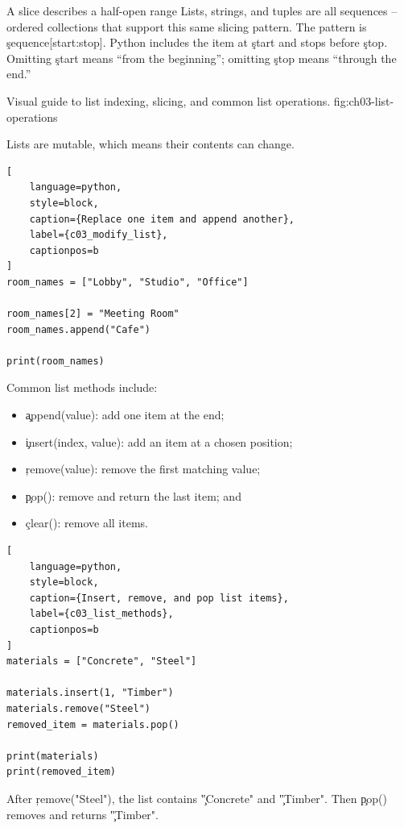 \begin{SyntaxBox}{A slice describes a half-open range}
Lists, strings, and tuples are all sequences -- ordered collections that
support this same slicing pattern. The pattern is \c{sequence[start:stop]}.
Python includes the item at \c{start} and stops before \c{stop}. Omitting
\c{start} means ``from the beginning''; omitting \c{stop} means ``through the
end.''
\end{SyntaxBox}

{Visual guide to list indexing, slicing, and common list operations.}
{fig:ch03-list-operations}


Lists are mutable, which means their contents can change.

\begin{lstlisting}[
    language=python,
    style=block,
    caption={Replace one item and append another},
    label={c03_modify_list},
    captionpos=b
]
room_names = ["Lobby", "Studio", "Office"]

room_names[2] = "Meeting Room"
room_names.append("Cafe")

print(room_names)
\end{lstlisting}

Common list methods include:
\begin{itemize}
    \item \c{append(value)}: add one item at the end;
    \item \c{insert(index, value)}: add an item at a chosen position;
    \item \c{remove(value)}: remove the first matching value;
    \item \c{pop()}: remove and return the last item; and
    \item \c{clear()}: remove all items.
\end{itemize}

\begin{lstlisting}[
    language=python,
    style=block,
    caption={Insert, remove, and pop list items},
    label={c03_list_methods},
    captionpos=b
]
materials = ["Concrete", "Steel"]

materials.insert(1, "Timber")
materials.remove("Steel")
removed_item = materials.pop()

print(materials)
print(removed_item)
\end{lstlisting}

After \c{remove("Steel")}, the list contains \c{"Concrete"} and
\c{"Timber"}. Then \c{pop()} removes and returns \c{"Timber"}.

